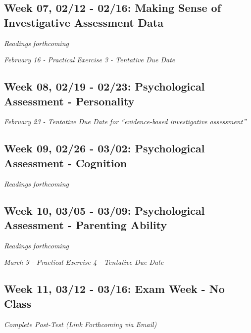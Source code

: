 \documentclass[11pt,]{article}
\begin{document}
\subsection{Week 07, 02/12 - 02/16: Making Sense of Investigative
Assessment
Data}\label{week-07-0212---0216-making-sense-of-investigative-assessment-data}

\emph{Readings forthcoming}

\emph{February 16 - Practical Exercise 3 - Tentative Due Date}

\subsection{Week 08, 02/19 - 02/23: Psychological Assessment -
Personality}\label{week-08-0219---0223-psychological-assessment---personality}

\emph{February 23 - Tentative Due Date for ``evidence-based
investigative assessment''}

\subsection{Week 09, 02/26 - 03/02: Psychological Assessment -
Cognition}\label{week-09-0226---0302-psychological-assessment---cognition}

\emph{Readings forthcoming}

\subsection{Week 10, 03/05 - 03/09: Psychological Assessment - Parenting
Ability}\label{week-10-0305---0309-psychological-assessment---parenting-ability}

\emph{Readings forthcoming}

\emph{March 9 - Practical Exercise 4 - Tentative Due Date}

\subsection{Week 11, 03/12 - 03/16: Exam Week - No
Class}\label{week-11-0312---0316-exam-week---no-class}

\emph{Complete Post-Test (Link Forthcoming via Email)}
\end{document}
